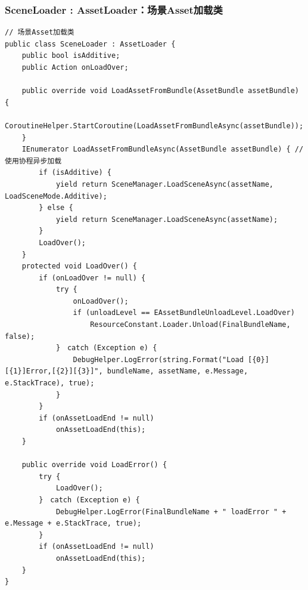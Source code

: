 \documentclass[9pt, b5paper]{article}
\begin{document}
\subsubsection{SceneLoader : AssetLoader：场景Asset加载类}
\label{sec-7-1-3}
\begin{verbatim}
// 场景Asset加载类
public class SceneLoader : AssetLoader {
    public bool isAdditive;
    public Action onLoadOver;

    public override void LoadAssetFromBundle(AssetBundle assetBundle) {
        CoroutineHelper.StartCoroutine(LoadAssetFromBundleAsync(assetBundle));
    }
    IEnumerator LoadAssetFromBundleAsync(AssetBundle assetBundle) { // 使用协程异步加载
        if (isAdditive) {
            yield return SceneManager.LoadSceneAsync(assetName, LoadSceneMode.Additive);
        } else {
            yield return SceneManager.LoadSceneAsync(assetName);
        }
        LoadOver();
    }
    protected void LoadOver() {
        if (onLoadOver != null) {
            try {
                onLoadOver();
                if (unloadLevel == EAssetBundleUnloadLevel.LoadOver) 
                    ResourceConstant.Loader.Unload(FinalBundleName, false);
            }　catch (Exception e) {
                DebugHelper.LogError(string.Format("Load [{0}][{1}]Error,[{2}][{3}]", bundleName, assetName, e.Message, e.StackTrace), true);
            }
        }
        if (onAssetLoadEnd != null) 
            onAssetLoadEnd(this);
    }

    public override void LoadError() {
        try {
            LoadOver();
        }　catch (Exception e) {
            DebugHelper.LogError(FinalBundleName + " loadError " + e.Message + e.StackTrace, true);
        }
        if (onAssetLoadEnd != null) 
            onAssetLoadEnd(this);
    }
}
\end{verbatim}
\end{document}
